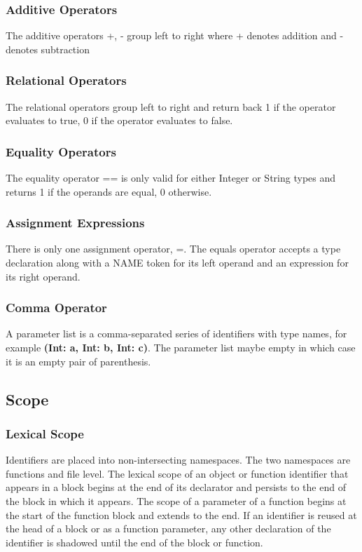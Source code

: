 \documentclass[12pt]{article}
\begin{document}
\subsubsection{Additive Operators}
The additive operators +, - group left to right where + denotes addition and - denotes subtraction

\subsubsection{Relational Operators}
The relational operators group left to right and return back 1 if the operator evaluates to true, 0 if the operator evaluates to false. 
 
\subsubsection{Equality Operators}
The equality operator == is only valid for either Integer or String types and returns 1 if the operands are equal, 0 otherwise. 

\subsubsection{Assignment Expressions}
There is only one assignment operator, =.  The equals operator accepts a type declaration along with a NAME token for its left operand and an expression for its right operand. 
 
\subsubsection{Comma Operator}
A parameter list is a comma-separated series of identifiers with type names, for example \textbf{(Int: a, Int: b, Int: c)}. The parameter list maybe empty in which case it is an empty pair of parenthesis. 

\subsection{Scope}

\subsubsection{Lexical Scope}
Identifiers are placed into non-intersecting namespaces.  The two namespaces are functions and file level.  The lexical scope of an object or function identifier that appears in a block begins at the end of its declarator and persists to the end of the block in which it appears.  The scope of a parameter of a function begins at the start of the function block and extends to the end.  If an identifier is reused at the head of a block or as a function parameter, any other declaration of the identifier is shadowed until the end of the block or function. 
\end{document}
